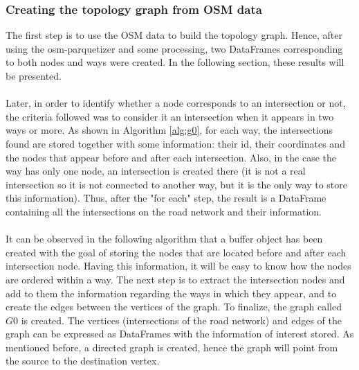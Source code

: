 \subsubsection{Creating the topology graph from \ac{OSM} data}
The first step is to use the \ac{OSM} data to build the topology graph. Hence, after using the osm-parquetizer and some processing, two DataFrames corresponding to both nodes and ways were created. In the following section, these results will be presented.
\\
\\
Later, in order to identify whether a node corresponds to an intersection or not, the criteria followed was to consider it an intersection when it appears in two ways or more.  As shown in Algorithm \ref{alg:g0}, for each way, the intersections found are stored together with some information: their id, their coordinates and the nodes that appear before and after each intersection. Also, in the case the way has only one node, an intersection is created there (it is not a real intersection so it is not connected to another way, but it is the only way to store this information). Thus, after the "for each" step, the result is a DataFrame containing all the intersections on the road network and their information. \\
\\
It can be observed in the following algorithm that a buffer object has been created with the goal of storing the nodes that are located before and after each intersection node. Having this information, it will be easy to know how the nodes are ordered within a way. 
The next step is to extract the intersection nodes and add to them the information regarding the ways in which they appear, and to create the edges between the vertices of the graph. To finalize, the graph called $G0$ is created. The vertices (intersections of the road network) and edges of the graph can be expressed as DataFrames with the information of interest stored. As mentioned before, a directed graph is created, hence the graph will point from the source to the destination vertex.
